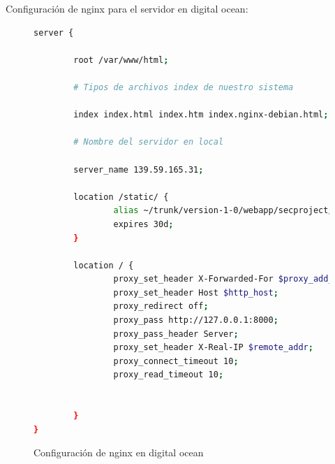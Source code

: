 Configuración de nginx para el servidor en digital ocean:

\begin{figure}[H]
\begin{lstlisting}[language=bash]
server {

        root /var/www/html;

        # Tipos de archivos index de nuestro sistema

        index index.html index.htm index.nginx-debian.html;

        # Nombre del servidor en local

        server_name 139.59.165.31;

        location /static/ {
                alias ~/trunk/version-1-0/webapp/secproject/static/;
                expires 30d;
        }

        location / {
                proxy_set_header X-Forwarded-For $proxy_add_x_forwarded_for;
                proxy_set_header Host $http_host;
                proxy_redirect off;
                proxy_pass http://127.0.0.1:8000;
                proxy_pass_header Server;
                proxy_set_header X-Real-IP $remote_addr;
                proxy_connect_timeout 10;
                proxy_read_timeout 10;


        }
}
\end{lstlisting}
\caption{Configuración de nginx en digital ocean}
\end{figure}
